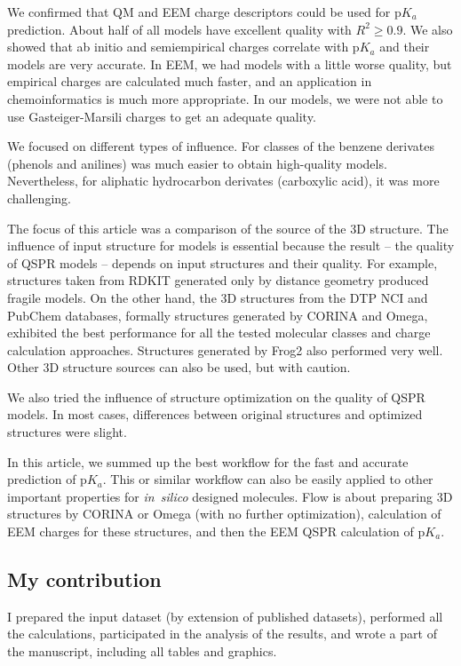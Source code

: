 We confirmed that QM and EEM charge descriptors could be used for p$K_a$
prediction. About half of all models have excellent quality with $R^2 \geq 0.9$.
We also showed that ab initio and semiempirical charges correlate with p$K_a$
and their models are very accurate. In EEM, we had models with a little worse
quality, but empirical charges are calculated much faster, and an application
in chemoinformatics is much more appropriate. In our models, we were not able
to use Gasteiger-Marsili charges to get an adequate quality. 

We focused on different types of influence. For classes of the benzene
de\-ri\-vates (phenols and anilines) was much easier to obtain high-quality models.
Nevertheless, for aliphatic hydrocarbon derivates (carboxylic acid), it was more
challenging.

The focus of this article was a comparison of the source of the 3D structure.
The influence of input structure for models is essential because
the result -- the quality of QSPR models -- depends on input structures and
their quality. For example, structures taken from RDKIT generated only by
distance geometry produced fragile models. On the other hand, the 3D structures
from the DTP NCI and PubChem databases, formally structures generated by CORINA
and Omega, exhibited the best performance for all the tested molecular classes
and charge calculation approaches. Structures generated by Frog2 also performed
very well. Other 3D structure sources can also be used, but with caution.

We also tried the influence of structure optimization on the quality of QSPR
models. In most cases, differences between original structures and optimized
structures were slight. 

In this article, we summed up the best workflow for the fast and accurate
prediction of p$K_a$. This or similar workflow can also be easily applied to other
important properties for \textit{in~silico} designed molecules. Flow is about preparing
3D structures by CORINA or Omega (with no further optimization), calculation of
EEM charges for these structures, and then the EEM QSPR calculation of p$K_a$.

\subsection{My contribution}

I prepared the input dataset (by extension of published datasets), performed
all the calculations, participated in the analysis of the results, and wrote
a part of the manuscript, including all tables and graphics.

